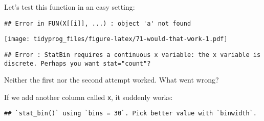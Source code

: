 \documentclass[]{book}
\newenvironment{Shaded}{\begin{snugshade}}{\end{snugshade}}
\newcommand{\DataTypeTok}[1]{\textcolor[rgb]{0.13,0.29,0.53}{#1}}
\newcommand{\DecValTok}[1]{\textcolor[rgb]{0.00,0.00,0.81}{#1}}
\newcommand{\KeywordTok}[1]{\textcolor[rgb]{0.13,0.29,0.53}{\textbf{#1}}}
\newcommand{\NormalTok}[1]{#1}
\newcommand{\OperatorTok}[1]{\textcolor[rgb]{0.81,0.36,0.00}{\textbf{#1}}}
\newcommand{\StringTok}[1]{\textcolor[rgb]{0.31,0.60,0.02}{#1}}
\begin{document}
Let's test this function in an easy setting:

\begin{Shaded}
\end{Shaded}

\begin{verbatim}
## Error in FUN(X[[i]], ...) : object 'a' not found
\end{verbatim}

\begin{Shaded}
\end{Shaded}

\texttt{[image: tidyprog\_files/figure-latex/71-would-that-work-1.pdf]}

\begin{verbatim}
## Error : StatBin requires a continuous x variable: the x variable is discrete. Perhaps you want stat="count"?
\end{verbatim}

Neither the first nor the second attempt worked. What went wrong?

If we add another column called \texttt{x}, it suddenly works:

\begin{Shaded}
\end{Shaded}

\begin{verbatim}
## `stat_bin()` using `bins = 30`. Pick better value with `binwidth`.
\end{verbatim}
\end{document}
